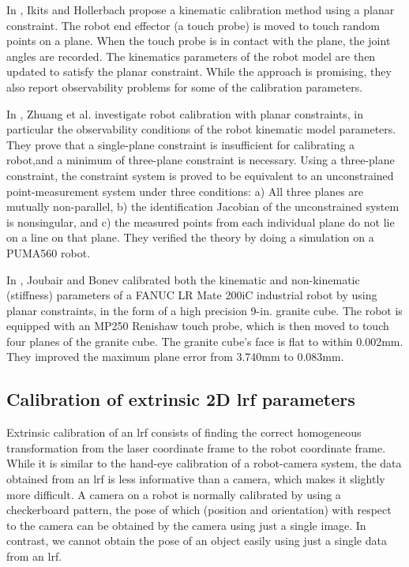 In \cite{Ikits1997}, Ikits and Hollerbach propose a kinematic calibration method using a planar constraint. The robot end effector (a touch probe) is moved to touch random points on a plane. When the touch probe is in contact with the plane, the joint angles are recorded. The kinematics parameters of the robot model are then updated to satisfy the planar constraint. While the approach is promising, they also report observability problems for some of the calibration parameters.  

In \cite{Zhuang1999}, Zhuang et al. investigate robot calibration with planar constraints, in particular the observability conditions of the robot kinematic model parameters. They prove that a single-plane constraint is insufficient for calibrating a robot,and a minimum of three-plane constraint is necessary. Using a three-plane constraint, the constraint system is proved to be equivalent to an unconstrained point-measurement system under three conditions: a) All three planes are mutually non-parallel, b) the identification Jacobian of the unconstrained system is nonsingular, and c) the measured points from each individual plane do not lie on a line on that plane. They verified the theory by doing a simulation on a PUMA560 robot. 

In \cite{Joubair2015}, Joubair and Bonev calibrated both the kinematic and non-kinematic (stiffness) parameters of a FANUC LR Mate 200iC industrial robot by using planar constraints, in the form of a high precision 9-in. granite cube. The robot is equipped with an MP250 Renishaw touch probe, which is then moved to touch four planes of the granite cube. The granite cube's face is flat to within 0.002mm. They improved the maximum plane error from 3.740mm to 0.083mm. 

\subsection{Calibration of extrinsic 2D \ac{lrf} parameters}
\label{sec:laser_calib}
Extrinsic calibration of an \ac{lrf} consists of finding the correct homogeneous transformation from the laser coordinate frame to the robot coordinate frame. While it is similar to the hand-eye calibration of a robot-camera system, the data obtained from an \ac{lrf} is less informative than a camera, which makes it slightly more difficult. A camera on a robot is normally calibrated by using a checkerboard pattern, the pose of which (position and orientation) with respect to the camera can be obtained by the camera using just a single image. In contrast, we cannot obtain the pose of an object easily using just a single data from an \ac{lrf}. 

